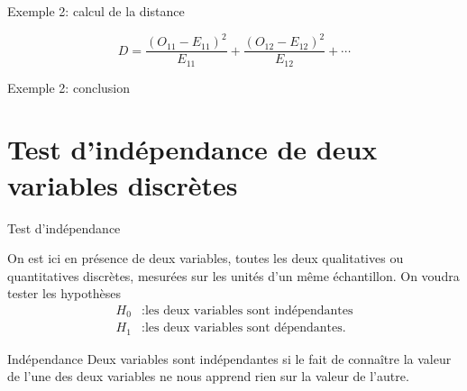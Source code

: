 \documentclass{BeamerTemplate}
\begin{document}
\begin{frame}[t]{Exemple 2: calcul de la distance}

\[
D=\frac{(O_{11}-E_{11})^2}{E_{11}}+\frac{(O_{12}-E_{12})^2}{E_{12}}+\cdots
\]

\vspace{4cm}

\end{frame}

\begin{frame}[t]{Exemple 2: conclusion}

\vspace{5cm}

\end{frame}

\section{Test d'indépendance de deux variables discrètes}

\begin{frame}[t]{Test d'indépendance}

On est ici en présence de \alert{deux variables}, toutes les deux qualitatives ou
quantitatives discrètes, mesurées sur les unités d'un \alert{même échantillon}.
On voudra tester les hypothèses
\begin{align*}
H_0&: \text{les deux variables sont indépendantes}\\
H_1&: \text{les deux variables sont dépendantes.}
\end{align*}

\begin{Boite}{Indépendance}
Deux variables sont indépendantes si le fait de connaître la valeur de l'une des
deux variables ne nous apprend rien sur la valeur de l'autre.
\end{Boite}

\end{frame}
\end{document}
